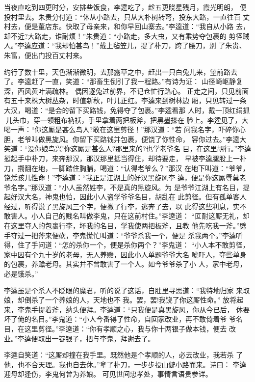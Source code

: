 当夜直吃到四更时分，安排些饭食，李逵吃了，趁五更晓星残月，霞光明朗，
便投村里去。朱贵分付道：“休从小路去，只从大朴树转弯，投东大路，一直往百
丈村去，便是董店东。快取了母亲来，和你早回山寨去。”李逵道：“我自从小路
去，却不近?大路走，谁耐烦！”朱贵道：“小路走，多大虫，又有乘势夺包裹的
剪径贼人。”李逵应道：“我却怕甚鸟！”戴上毡笠儿，提了朴刀，跨了腰刀，别
了朱贵、朱富，便出门投百丈村来。

约行了数十里，天色渐渐微明，去那露草之中，赶出一只白兔儿来，望前路去
了。李逵赶了一直，笑道：“那畜生倒引了我一程路。”有诗为证：
山径崎岖静复深，西风黄叶满疏林。
偶因逐兔过前界，不记仓忙行路心。
正走之间，只见前面有五十来株大树丛杂，时值新秋，叶儿正红。李逵来到树林边
厢，只见转过一条大汉，喝道：“是会的留下买路钱，免得夺了包裹。”李逵看那
人时，戴一顶红绢抓儿头巾，穿一领粗布衲袄，手里拿着两把板斧，把黑墨搽在
脸上。李逵见了，大喝一声：“你这厮是甚么鸟人?敢在这里剪径！”那汉道：“若
问我名字，吓碎你心胆，老爷叫做黑旋风。你留下买路钱并包裹，便饶了你性命，
容你过去。”李逵大笑道：“没你娘鸟兴!你这厮是甚么人?那里来的?也学老爷名
目，在这里胡行。”李逵挺起手中朴刀，来奔那汉，那汉那里抵当得住，却待要走，
早被李逵腿股上一朴刀，搠翻在地，一脚踏住胸脯，喝道：“认得老爷么？”那汉
在地下叫道：“爷爷，饶恁孩儿性命！”李逵道：“我正是江湖上的好汉黑旋风李
逵，便是你这厮辱莫老爷名字。”那汉道：“小人虽然姓李，不是真的黑旋风。为
是爷爷江湖上有名目，提起好汉大名，神鬼也怕，因此小人盗学爷爷名目，胡乱在
此剪径。但有孤单客人经过，听得说了黑旋风三个字，便撇了行李，逃奔了去，以
此得这些利息，实不敢害人。小人自己的贱名叫做李鬼，只在这前村住。”李逵道：
“叵耐这厮无礼，却在这里夺人的包裹行李，坏我的名目，学我使两把板斧，且教
他先吃我一斧。”劈手夺过一把斧来便砍，李鬼慌忙叫道：“爷爷杀我一个，便是
杀我两个。”李逵听得，住了手问道：“怎的杀你一个，便是杀你两个？”李鬼道：
“小人本不敢剪径，家中因有个九十岁的老母，无人养赡，因此小人单题爷爷大名
唬吓人，夺些单身的包裹，养赡老母。其实并不曾敢害了一个人。如今爷爷杀了小
人，家中老母，必是饿杀。”

李逵虽是个杀人不眨眼的魔君，听的说了这话，自肚里寻思道：“我特地归家
来取娘，却倒杀了一个养娘的人，天地也不我。罢，罢!我饶了你这厮性命。”
放将起来，李鬼手提着斧，纳头便拜。李逵道：“只我便是真黑旋风，你从今已后，
休要坏了俺的名目。”李鬼道：“小人今番得了性命，自回家改业，再不敢倚着爷
爷名目，在这里剪径。”李逵道：“你有孝顺之心，我与你十两银子做本钱，便去
改业。”李逵便取出一锭银子，把与李鬼，拜谢去了。

李逵自笑道：“这厮却撞在我手里。既然他是个孝顺的人，必去改业，我若杀
了他，也不合天理。我也自去休。”拿了朴刀，一步步投山僻小路而来。诗曰：
李逵迎母却逢伤，李鬼何曾为养娘。
可见世间忠孝处，事情言语贵参详。

